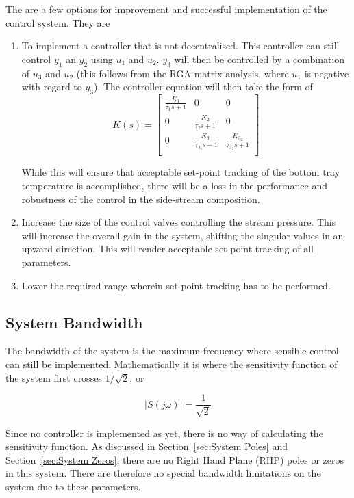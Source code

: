 The are a few options for improvement and successful implementation of the control system. They are

\begin{enumerate}
	\item To implement a controller that is not decentralised. This controller can still control $y_1$ an $y_2$ using $u_1$ and $u_2$. $y_3$ will then be controlled by a combination of $u_3$ and $u_2$ (this follows from the RGA matrix analysis, where $u_1$ is negative with regard to $y_3$). The controller equation will then take the form of
	\begin{equation}
		K(s) = \begin{bmatrix}
		\frac{K_1}{\tau_1s + 1} & 0 & 0\\
		0 &\frac{K_2}{\tau_2s + 1} & 0\\
		0 & \frac{K_{3_1}}{\tau_{3_1}s + 1} & \frac{K_{3_2}}{\tau_{3_2}s + 1}\\
		\end{bmatrix}
	\end{equation}
	
	While this will ensure that acceptable set-point tracking of the bottom tray temperature is accomplished, there will be a loss in the performance and robustness of the control in the side-stream composition.
	
	\item Increase the size of the control valves controlling the stream pressure. This will increase the overall gain in the system, shifting the singular values in an upward direction. This will render acceptable set-point tracking of all parameters.
	
	\item Lower the required range wherein set-point tracking has to be performed. 
\end{enumerate}

\subsection{System Bandwidth}

The bandwidth of the system is the maximum frequency where sensible control can still be implemented. Mathematically it is where the sensitivity function of the system first crosses $1/\sqrt{2}$, or

\begin{equation}
	|S(j\omega)| = \frac{1}{\sqrt{2}}
\end{equation}

Since no controller is implemented as yet, there is no way of calculating the sensitivity function. As discussed in Section~\ref{sec:System Poles} and Section~\ref{sec:System Zeros}, there are no Right Hand Plane (RHP) poles or zeros in this system. There are therefore no special bandwidth limitations on the system due to these parameters.

